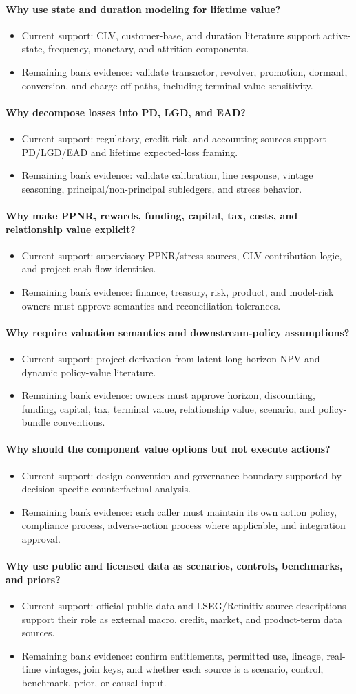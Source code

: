 \documentclass[11pt]{article}
\newcommand{\1}{\mathbf{1}}
\newcommand{\contractitem}[2]{\paragraph{#1}\begin{itemize}[leftmargin=1.5em,itemsep=0.12em,topsep=0.18em]#2\end{itemize}}
\begin{document}
\contractitem{Why use state and duration modeling for lifetime value?}{
  \item Current support: CLV, customer-base, and duration literature support
        active-state, frequency, monetary, and attrition components.
  \item Remaining bank evidence: validate transactor, revolver, promotion,
        dormant, conversion, and charge-off paths, including terminal-value
        sensitivity.
}
\contractitem{Why decompose losses into PD, LGD, and EAD?}{
  \item Current support: regulatory, credit-risk, and accounting sources
        support PD/LGD/EAD and lifetime expected-loss framing.
  \item Remaining bank evidence: validate calibration, line response, vintage
        seasoning, principal/non-principal subledgers, and stress behavior.
}
\contractitem{Why make PPNR, rewards, funding, capital, tax, costs, and relationship value explicit?}{
  \item Current support: supervisory PPNR/stress sources, CLV contribution
        logic, and project cash-flow identities.
  \item Remaining bank evidence: finance, treasury, risk, product, and
        model-risk owners must approve semantics and reconciliation
        tolerances.
}
\contractitem{Why require valuation semantics and downstream-policy assumptions?}{
  \item Current support: project derivation from latent long-horizon NPV and
        dynamic policy-value literature.
  \item Remaining bank evidence: owners must approve horizon, discounting,
        funding, capital, tax, terminal value, relationship value, scenario,
        and policy-bundle conventions.
}
\contractitem{Why should the component value options but not execute actions?}{
  \item Current support: design convention and governance boundary supported by
        decision-specific counterfactual analysis.
  \item Remaining bank evidence: each caller must maintain its own action
        policy, compliance process, adverse-action process where applicable,
        and integration approval.
}
\contractitem{Why use public and licensed data as scenarios, controls, benchmarks, and priors?}{
  \item Current support: official public-data and LSEG/Refinitiv-source
        descriptions support their role as external macro, credit, market, and
        product-term data sources.
  \item Remaining bank evidence: confirm entitlements, permitted use, lineage,
        real-time vintages, join keys, and whether each source is a scenario,
        control, benchmark, prior, or causal input.
}
\end{document}
